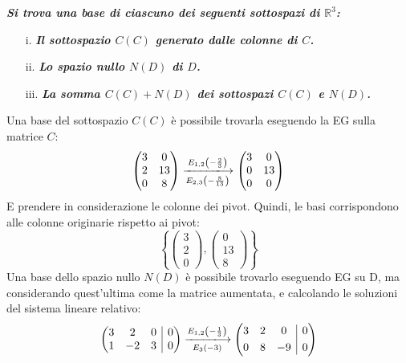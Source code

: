 \documentclass[a4paper]{article}
\makeatletter
\newenvironment{rowequmat}[1]{\left(\array{@{}#1@{}}}{\endarray\right)}
\makeatother
\begin{document}
	\textcolor{Green4}{\textbf{\emph{Si trova una base di ciascuno dei seguenti sottospazi di $\mathbb{R}^{3}$:}}}
	\begin{enumerate}
		\item[i.] \textcolor{Green4}{\textbf{\emph{Il sottospazio $C(C)$ generato dalle colonne di $C$.}}}
		\item[ii.] \textcolor{Green4}{\textbf{\emph{Lo spazio nullo $N(D)$ di $D$.}}}
		\item[iii.] \textcolor{Green4}{\textbf{\emph{La somma $C(C) + N(D)$ dei sottospazi $C(C)$ e $N(D)$.}}}
	\end{enumerate}
	Una base del sottospazio $C(C)$ è possibile trovarla eseguendo la EG sulla matrice $C$:
	\begin{equation*}
		\begin{pmatrix}
			3 & 0 \\
			2 & 13 \\
			0 & 8
		\end{pmatrix}
		\xlongrightarrow[E_{2,3}\left(-\frac{8}{13}\right)]{E_{1,2}\left(-\frac{2}{3}\right)}
		\begin{pmatrix}
			3 & 0 \\
			0 & 13 \\
			0 & 0
		\end{pmatrix}
	\end{equation*}
	E prendere in considerazione le colonne dei pivot. Quindi, le basi corrispondono alle colonne originarie rispetto ai pivot:
	\begin{equation*}
		\left\{\begin{pmatrix}
			3 \\ 2 \\ 0
		\end{pmatrix}, \begin{pmatrix}
			0 \\ 13 \\ 8 
		\end{pmatrix}\right\}
	\end{equation*}
	Una base dello spazio nullo $N(D)$ è possibile trovarlo eseguendo EG su D, ma considerando quest'ultima come la matrice aumentata, e calcolando le soluzioni del sistema lineare relativo:
	\begin{equation*}
		\begin{rowequmat}{ccc|c}
			3 & 2 & 0  & 0 \\
			1 & -2 & 3 & 0
		\end{rowequmat}
		\xlongrightarrow[E_{3}\left(-3\right)]{E_{1,2}\left(-\frac{1}{3}\right)}
		\begin{rowequmat}{ccc|c}
			3 & 2 & 0  & 0 \\ [.3em]
			0 & 8 & -9 & 0
		\end{rowequmat}
	\end{equation*}
\end{document}

